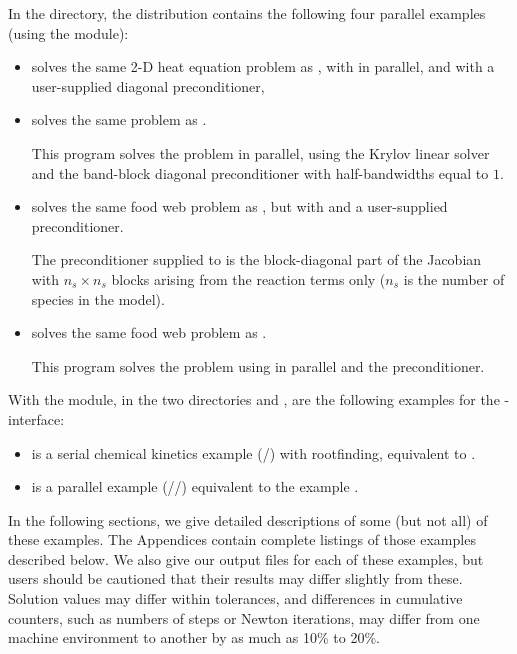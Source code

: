 In the  directory, the {\ida} 
distribution contains the following four parallel examples 
(using the {\nvecp} module):
\begin{itemize}

\item {}
  solves the same 2-D heat equation problem as , with {\idaspgmr}
  in parallel, and with a user-supplied diagonal preconditioner,
  
\item {}
  solves the same problem as .

  This program solves the problem in parallel, using the Krylov linear solver
  {\idaspgmr} and the band-block diagonal preconditioner {\idabbdpre} with
  half-bandwidths equal to $1$.

\item {}
  solves the same food web problem as , but with {\idaspgmr}
  and a user-supplied preconditioner.
  
  The preconditioner supplied to {\idaspgmr} is the block-diagonal part of 
  the Jacobian with $n_s \times n_s$ blocks arising from the reaction terms only
  ($n_s$ is the number of species in the model).

\item {}
  solves the same food web problem as .

  This program solves the problem using {\idaspgmr} in parallel and the
  {\idabbdpre} preconditioner.

\end{itemize}

With the {\fida} module, in the two directories
 and
, are the following
examples for the {\F}-{\C} interface:
%
\begin{itemize}
\item {} is a serial chemical kinetics example (/{\dense})
       with rootfinding, equivalent to .

\item {} is a parallel example (/{\spgmr}/{\idabbdpre})
       equivalent to the example .

\end{itemize}

\vspace{0.2in}\noindent 
In the following sections, we give detailed descriptions of some (but
not all) of these examples.  The Appendices contain complete listings
of those examples described below.  We also give our output files for
each of these examples, but users should be cautioned that their
results may differ slightly from these.  Solution
values may differ within tolerances, and differences in cumulative
counters, such as numbers of steps or Newton iterations, may differ
from one machine environment to another by as much as 10\% to 20\%.


